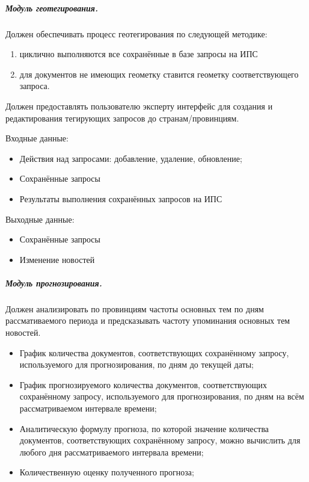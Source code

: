 \subparagraph{Модуль геотегирования.} \hfill

Должен обеспечивать процесс геотегирования по следующей методике:

\begin{enumerate}
\item циклично выполняются все сохранённые в базе запросы на ИПС
\item для документов не имеющих геометку ставится геометку соответствующего запроса.
\end{enumerate}

Должен предоставлять пользователю эксперту интерфейс для создания и редактирования тегирующих запросов до странам/провинциям.

Входные данные:
\begin{itemize}
\item Действия над запросами: добавление, удаление, обновление;
\item Сохранённые запросы
\item Результаты выполнения сохранённых запросов на ИПС
\end{itemize}

Выходные данные:
\begin{itemize}
\item Сохранённые запросы
\item Изменение новостей
\end{itemize}

\clearpage
\subparagraph{Модуль прогнозирования.} \hfill

Должен анализировать по провинциям частоты основных тем по дням рассмативаемого периода и предсказывать частоту упоминания основных тем новостей.

\begin{itemize}
\item График количества документов, соответствующих сохранённому запросу, используемого для прогнозирования, по дням до текущей даты;
\item График прогнозируемого количества документов, соответствующих сохранённому запросу, используемого для прогнозирования, по дням на всём рассматриваемом интервале времени;
\item Аналитическую формулу прогноза, по которой значение количества документов, соответствующих сохранённому запросу, можно вычислить для любого дня рассматриваемого интервала времени;
\item Количественную оценку полученного прогноза;
\end{itemize}

